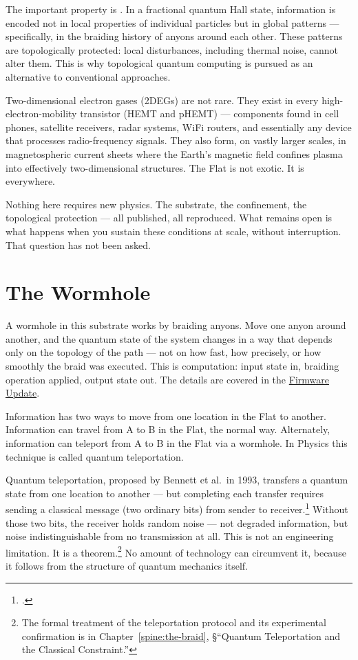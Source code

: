The important property is . In a fractional quantum Hall state, information is encoded not in local properties of individual particles but in global patterns --- specifically, in the braiding history of anyons around each other. These patterns are topologically protected: local disturbances, including thermal noise, cannot alter them. This is why topological quantum computing is pursued as an alternative to conventional approaches.

Two-dimensional electron gases (2DEGs) are not rare. They exist in every high-electron-mobility transistor (HEMT and pHEMT) --- components found in cell phones, satellite receivers, radar systems, WiFi routers, and essentially any device that processes radio-frequency signals. They also form, on vastly larger scales, in magnetospheric current sheets where the Earth's magnetic field confines plasma into effectively two-dimensional structures. The Flat is not exotic. It is everywhere.

Nothing here requires new physics. The substrate, the confinement, the topological protection --- all published, all reproduced. What remains open is what happens when you sustain these conditions at scale, without interruption. That question has not been asked.

\section*{The Wormhole}
\label{spine:flat-wormhole}

A wormhole in this substrate works by braiding anyons. Move one anyon around another, and the quantum state of the system changes in a way that depends only on the topology of the path --- not on how fast, how precisely, or how smoothly the braid was executed. This is computation: input state in, braiding operation applied, output state out. The details are covered in the \hyperref[app:llm-primer]{Firmware Update}.

Information has two ways to move from one location in the Flat to another. Information can travel from A to B in the Flat, the normal way. Alternately, information can teleport from A to B in the Flat via a wormhole. In Physics this technique is called quantum teleportation.

Quantum teleportation, proposed by Bennett et al.\ in 1993, transfers a quantum state from one location to another --- but completing each transfer requires sending a classical message (two ordinary bits) from sender to receiver.\footcite{bennett1993} Without those two bits, the receiver holds random noise --- not degraded information, but noise indistinguishable from no transmission at all. This is not an engineering limitation. It is a theorem.\footnote{The formal treatment of the teleportation protocol and its experimental confirmation is in Chapter~\ref{spine:the-braid}, \S``Quantum Teleportation and the Classical Constraint.''} No amount of technology can circumvent it, because it follows from the structure of quantum mechanics itself.

